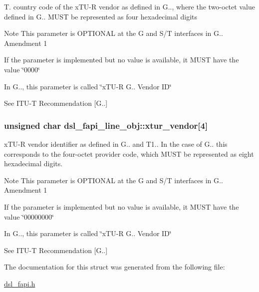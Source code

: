 T. country code of the x\-T\-U-\/\-R vendor as defined in G.., where the two-\/octet value defined in G.. M\-U\-S\-T be represented as four hexadecimal digits \begin{DoxyNote}{Note}
This parameter is O\-P\-T\-I\-O\-N\-A\-L at the G and S/\-T interfaces in G.. Amendment 1 

If the parameter is implemented but no value is available, it M\-U\-S\-T have the value \char`\"{}0000\char`\"{} 

In G.., this parameter is called \char`\"{}x\-T\-U-\/\-R G.. Vendor I\-D\char`\"{} 

See I\-T\-U-\/\-T Recommendation \mbox{[}G..\mbox{]} 
\end{DoxyNote}
\hypertarget{structdsl__fapi__line__obj_a84427f6c66bdf205931732cee9c63bb1}{
\subsubsection[{xtur\-\_\-vendor}]{\setlength{\rightskip}{0pt plus 5cm}unsigned char dsl\-\_\-fapi\-\_\-line\-\_\-obj\-::xtur\-\_\-vendor\mbox{[}4\mbox{]}}}\label{structdsl__fapi__line__obj_a84427f6c66bdf205931732cee9c63bb1}
x\-T\-U-\/\-R vendor identifier as defined in G.. and T1.. In the case of G.. this corresponds to the four-\/octet provider code, which M\-U\-S\-T be represented as eight hexadecimal digits. \begin{DoxyNote}{Note}
This parameter is O\-P\-T\-I\-O\-N\-A\-L at the G and S/\-T interfaces in G.. Amendment 1 

If the parameter is implemented but no value is available, it M\-U\-S\-T have the value \char`\"{}00000000\char`\"{} 

In G.., this parameter is called \char`\"{}x\-T\-U-\/\-R G.. Vendor I\-D\char`\"{} 

See I\-T\-U-\/\-T Recommendation \mbox{[}G..\mbox{]} 
\end{DoxyNote}


The documentation for this struct was generated from the following file\-:\begin{DoxyCompactItemize}
\item 
\hyperlink{dsl__fapi_8h}{dsl\-\_\-fapi.\-h}\end{DoxyCompactItemize}
